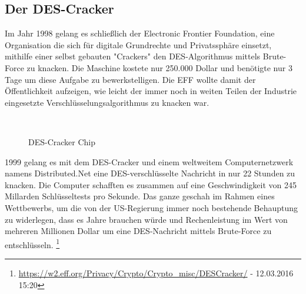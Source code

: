 \documentclass[
10pt, %
a4paper, %
oneside, %
headinclude,footinclude, %
BCOR5mm, %
]{scrartcl}
\begin{document}
\subsection{Der DES-Cracker} 
Im Jahr 1998 gelang es schließlich der Electronic Frontier Foundation, eine Organisation die sich für digitale Grundrechte und Privatssphäre einsetzt, mithilfe einer selbst gebauten "Crackers" den DES-Algorithmus mittels Brute-Force zu knacken. Die Maschine kostete nur 250.000 Dollar und benötigte nur 3 Tage um diese Aufgabe zu bewerkstelligen. Die EFF wollte damit der Öffentlichkeit aufzeigen, wie leicht der immer noch in weiten Teilen der Industrie eingesetzte Verschlüsselungsalgorithmus zu knacken war.
\begin{figure}[tb]
\centering
{} \quad
{} \\
\caption[DES-Cracker.]{DES-Cracker Chip \footnotemark}
\label{fig:ChipBoard}
\end{figure}
1999 gelang es mit dem DES-Cracker und einem weltweitem Computernetzwerk namens Distributed.Net eine DES-verschlüsselte Nachricht in nur 22 Stunden zu knacken. Die Computer schafften es zusammen auf eine Geschwindigkeit von 245 Millarden Schlüsseltests pro Sekunde. Das ganze geschah im Rahmen eines Wettbewerbs, um die von der US-Regierung immer noch bestehende Behauptung zu widerlegen, dass es Jahre brauchen würde und Rechenleistung im Wert von mehreren Millionen Dollar um eine DES-Nachricht mittels Brute-Force zu entschlüsseln. \footnote{\url{https://w2.eff.org/Privacy/Crypto/Crypto_misc/DESCracker/} - 12.03.2016 15:20}
\end{document}
